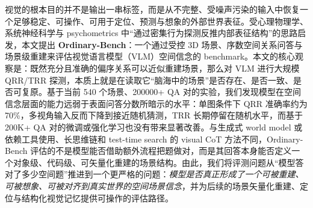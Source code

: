 视觉的根本目的并不是输出一串标签，而是从不完整、受噪声污染的输入中恢复一个足够稳定、可操作、可用于定位、预测与想象的外部世界表征。受心理物理学、系统神经科学与 psychometrics 中“通过密集行为探测反推内部表征结构”的思路启发，本文提出 \textbf{Ordinary-Bench}：一个通过受控 3D 场景、序数空间关系问答与场景级重建来评估视觉语言模型（VLM）空间信念的 benchmark。本文的核心观察是：既然充分且准确的偏序关系可以近似重建场景，那么对 VLM 进行大规模 QRR/TRR 探测，本质上就是在读取它“脑海中的场景”是否存在、是否一致、是否可复原。基于当前 540 个场景、200000+ QA 对的实验，我们发现模型在空间信念层面的能力远弱于表面问答分数所暗示的水平：单图条件下 QRR 准确率约为 70\%，多视角输入反而下降到接近随机猜测，TRR 长期停留在随机水平，而基于 200K+ QA 对的微调或强化学习也没有带来显著改善。与生成式 world model 或依赖工具使用、长思维链和 test-time search 的 visual CoT 方法不同，Ordinary-Bench 评估的不是模型能否借助额外流程把题做对，而是其回答本身能否定义一个对象级、代码级、可矢量化重建的场景结构。由此，我们将评测问题从“模型答对了多少空间题”推进到一个更严格的问题：\emph{模型是否真正形成了一个可被重建、可被想象、可被对齐到真实世界的空间场景信念}，并为后续的场景矢量化重建、定位与结构化视觉记忆提供可操作的评估路径。
